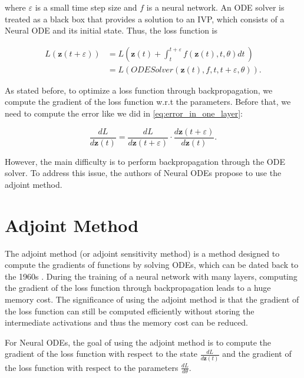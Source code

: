 \documentclass[
	parskip, 			   %
	twoside, 			   %
	DIV=14, 			   %
	BCOR=15.0mm, 		   %
	headsepline, 		   %
	open=right, 		   %
	captions=tableheading, %
	bibliography=totoc,    %
	numbers=noenddot       %
]{scrreprt}
\begin{document}
where $\varepsilon $ is a small time step size and $f$ is a neural network. An ODE solver is treated as a black box that provides a solution to an IVP, which consists of a Neural ODE and its initial state. Thus, the loss function is

\begin{equation}
    \label{eq:Neural_ODE_Gradient_loss}
    \begin{aligned}
    L(\mathbf{z}(t+\varepsilon )) &= L(\mathbf{z}(t) + \int_{t}^{t+\varepsilon } f(\mathbf{z}(t), t, \theta)dt \:)\\
    &= L(ODESolver(\mathbf{z}(t), f, t, t+\varepsilon , \theta)).
    \end{aligned}
\end{equation}

As stated before, to optimize a loss function through backpropagation, we compute the gradient of the loss function w.r.t the parameters. Before that, we need to compute the error like we did in \ref{eq:error_in_one_layer}:

\begin{equation}
    \label{eq:Neural_ODE_error}
    \frac{d L}{d\mathbf{z}(t)} = \frac{d L}{d\mathbf{z}(t+\varepsilon )} \cdot \frac{d\mathbf{z}(t+\varepsilon )}{d\mathbf{z}(t)}.
\end{equation}

However, the main difficulty is to perform backpropagation through the ODE solver. To address this issue, the authors of Neural ODEs propose to use the adjoint method.


\section{Adjoint Method}
The adjoint method (or adjoint sensitivity method) is a method designed to compute the gradients of functions by solving ODEs, which can be dated back to the 1960s \cite{boltyanskiy1962mathematical}. During the training of a neural network with many layers, computing the gradient of the loss function through backpropagation leads to a huge memory cost. The significance of using the adjoint method is that the gradient of the loss function can still be computed efficiently without storing the intermediate activations and thus the memory cost can be reduced.

For Neural ODEs, the goal of using the adjoint method is to compute the gradient of the loss function with respect to the state $\frac{d L}{d\mathbf{z}(t)}$ and the gradient of the loss function with respect to the parameters $\frac{d L}{d\theta}$.
\end{document}
